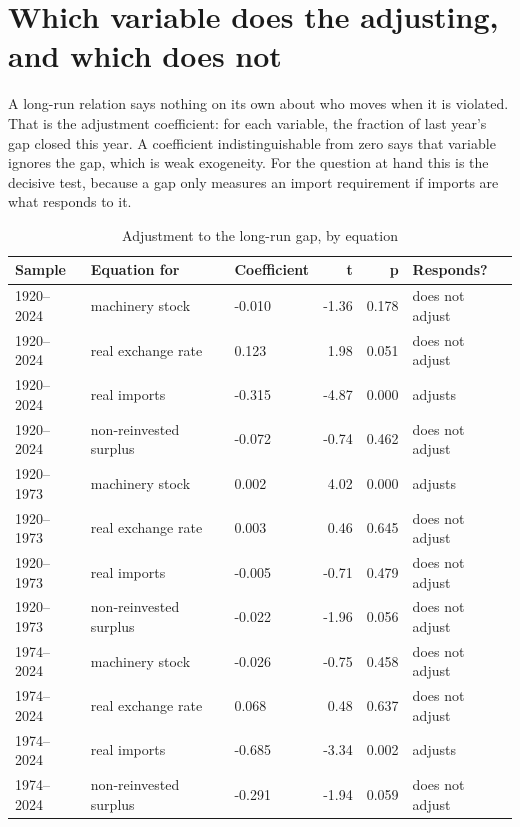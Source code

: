 \documentclass[11pt]{article}
\begin{document}
\FloatBarrier
\section{Which variable does the adjusting, and which does not}
\label{sec:alpha}

A long-run relation says nothing on its own about who moves when it is violated. That is the adjustment coefficient: for each variable, the fraction of last year's gap closed this year. A coefficient indistinguishable from zero says that variable ignores the gap, which is weak exogeneity. For the question at hand this is the decisive test, because a gap only measures an import requirement if imports are what responds to it.

\begin{table}[H]
\centering
\caption{Adjustment to the long-run gap, by equation}
\begin{tabular}{p{2.2cm}p{3.6cm}p{2.2cm}rrp{3.0cm}}
\toprule
\textbf{Sample} & \textbf{Equation for} & \textbf{Coefficient} & \textbf{t} & \textbf{p} & \textbf{Responds?} \\
\midrule
1920--2024 & machinery stock & -0.010 & -1.36 & 0.178 & does not adjust \\
1920--2024 & real exchange rate & 0.123 & 1.98 & 0.051 & does not adjust \\
1920--2024 & real imports & -0.315 & -4.87 & 0.000 & adjusts \\
1920--2024 & non-reinvested surplus & -0.072 & -0.74 & 0.462 & does not adjust \\
1920--1973 & machinery stock & 0.002 & 4.02 & 0.000 & adjusts \\
1920--1973 & real exchange rate & 0.003 & 0.46 & 0.645 & does not adjust \\
1920--1973 & real imports & -0.005 & -0.71 & 0.479 & does not adjust \\
1920--1973 & non-reinvested surplus & -0.022 & -1.96 & 0.056 & does not adjust \\
1974--2024 & machinery stock & -0.026 & -0.75 & 0.458 & does not adjust \\
1974--2024 & real exchange rate & 0.068 & 0.48 & 0.637 & does not adjust \\
1974--2024 & real imports & -0.685 & -3.34 & 0.002 & adjusts \\
1974--2024 & non-reinvested surplus & -0.291 & -1.94 & 0.059 & does not adjust \\
\bottomrule
\end{tabular}
\end{table}
\end{document}
